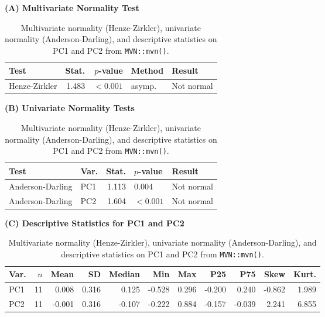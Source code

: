 \documentclass[12pt, a4paper]{article}
\begin{document}
\begin{table}[htbp!]
    \centering
    \caption{Multivariate normality (Henze-Zirkler), univariate normality (Anderson-Darling), and descriptive statistics on PC1 and PC2 from \texttt{MVN::mvn()}.}
    \label{tab:mvn_portrait}
    \scriptsize
    \setlength{\tabcolsep}{3.5pt}

    \begin{minipage}[t]{0.55\textwidth}
        \centering
        \textbf{(A) Multivariate Normality Test}\\[0.2em]
        \begin{tabular}{lrrll}
            \toprule
            Test & Stat. & $p$-value & Method & Result \\
            \midrule
            Henze-Zirkler & 1.483 & $<0.001$ & asymp. & Not normal \\
            \bottomrule
        \end{tabular}
    \end{minipage}\hfill
    \begin{minipage}[t]{0.42\textwidth}
        \centering
        \textbf{(B) Univariate Normality Tests}\\[0.2em]
        \begin{tabular}{llrll}
            \toprule
            Test & Var. & Stat. & $p$-value & Result \\
            \midrule
            Anderson-Darling & PC1 & 1.113 & $0.004$ & Not normal \\
            Anderson-Darling & PC2 & 1.604 & $<0.001$ & Not normal \\
            \bottomrule
        \end{tabular}
    \end{minipage}

    \vspace{0.55cm}

    \begin{minipage}{\textwidth}
        \centering
        \textbf{(C) Descriptive Statistics for PC1 and PC2}\\[0.2em]
        \begin{tabular}{lrrrrrrrrrr}
            \toprule
            Var. & $n$ & Mean & SD & Median & Min & Max & P25 & P75 & Skew & Kurt. \\
            \midrule
            PC1 & 11 &  0.008 & 0.316 &  0.125 & -0.528 & 0.296 & -0.200 &  0.240 & -0.862 & 1.989 \\
            PC2 & 11 & -0.001 & 0.316 & -0.107 & -0.222 & 0.884 & -0.157 & -0.039 &  2.241 & 6.855 \\
            \bottomrule
        \end{tabular}
    \end{minipage}
\end{table}
\end{document}
